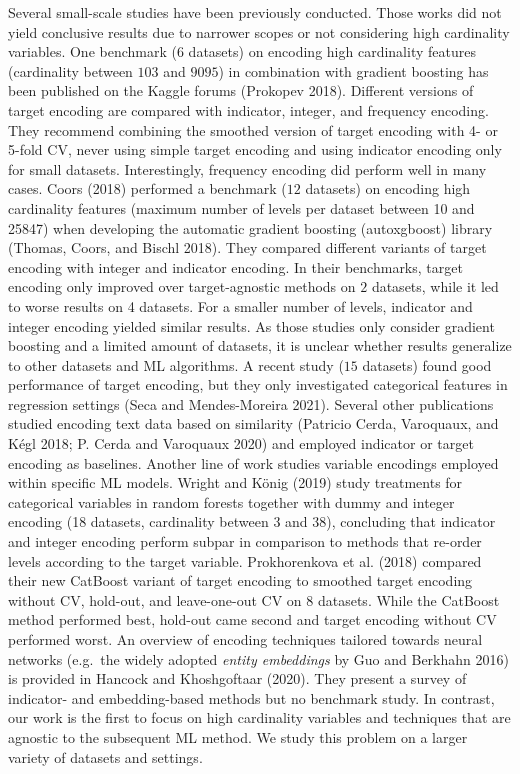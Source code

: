 \documentclass[smallextended]{svjour3}       %
\begin{document}
Several small-scale studies have been previously conducted.
Those works did not yield conclusive results due to narrower scopes or not considering high cardinality variables.
One benchmark (\(6\) datasets) on encoding high cardinality features (cardinality between \(103\) and \(9095\)) in combination with gradient boosting has been published on the Kaggle forums (Prokopev 2018).
Different versions of target encoding are compared with indicator, integer, and frequency encoding.
They recommend combining the smoothed version of target encoding with 4- or 5-fold CV, never using simple target encoding and using indicator encoding only for small datasets.
Interestingly, frequency encoding did perform well in many cases.
Coors (2018) performed a benchmark (\(12\) datasets) on encoding high cardinality features (maximum number of levels per dataset between 10 and 25847) when developing the automatic gradient boosting (autoxgboost) library (Thomas, Coors, and Bischl 2018). They compared different variants of target encoding with integer and indicator encoding. In their benchmarks, target encoding only improved over target-agnostic methods on \(2\) datasets, while it led to worse results on 4 datasets. For a smaller number of levels, indicator and integer encoding yielded similar results.
As those studies only consider gradient boosting and a limited amount of datasets, it is unclear whether results generalize to other datasets and ML algorithms.
A recent study (\(15\) datasets) found good performance of target encoding, but they only investigated categorical features in regression settings (Seca and Mendes-Moreira 2021).
Several other publications studied encoding text data based on similarity (Patricio Cerda, Varoquaux, and Kégl 2018; P. Cerda and Varoquaux 2020) and employed indicator or target encoding as baselines.
Another line of work studies variable encodings employed within specific ML models.
Wright and König (2019) study treatments for categorical variables in random forests together with dummy and integer encoding (18 datasets, cardinality between \(3\) and \(38\)), concluding that indicator and integer encoding perform subpar in comparison to methods that re-order levels according to the target variable.
Prokhorenkova et al. (2018) compared their new CatBoost variant of target encoding to smoothed target encoding without CV, hold-out, and leave-one-out CV on \(8\) datasets.
While the CatBoost method performed best, hold-out came second and target encoding without CV performed worst.
An overview of encoding techniques tailored towards neural networks (e.g.~the widely adopted \emph{entity embeddings} by Guo and Berkhahn 2016) is provided in Hancock and Khoshgoftaar (2020).
They present a survey of indicator- and embedding-based methods but no benchmark study.
In contrast, our work is the first to focus on high cardinality variables and techniques that are agnostic to the subsequent ML method.
We study this problem on a larger variety of datasets and settings.
\newline
\end{document}
